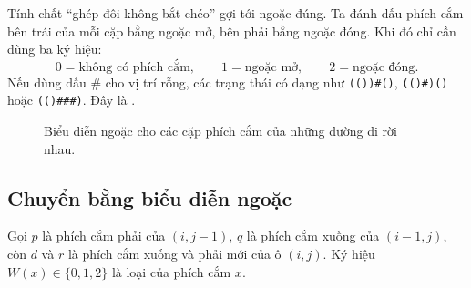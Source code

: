 \documentclass[11pt]{article}
\begin{document}
Tính chất ``ghép đôi không bắt chéo'' gợi tới ngoặc đúng. Ta đánh dấu phích
cắm bên trái của mỗi cặp bằng ngoặc mở, bên phải bằng ngoặc đóng. Khi đó chỉ
cần dùng ba ký hiệu:
\[
  0=\text{không có phích cắm},\qquad
  1=\text{ngoặc mở},\qquad
  2=\text{ngoặc đóng}.
\]
Nếu dùng dấu \(\#\) cho vị trí rỗng, các trạng thái có dạng như
\texttt{(())\#()}, \texttt{(()\#)()} hoặc \texttt{(()\#\#\#)}. Đây là
.

\begin{figure}[ht]
\centering
{}
\caption{Biểu diễn ngoặc cho các cặp phích cắm của những đường đi rời nhau.}
\end{figure}

\subsection{Chuyển bằng biểu diễn ngoặc}

Gọi \(p\) là phích cắm phải của \((i,j-1)\), \(q\) là phích cắm xuống của
\((i-1,j)\), còn \(d\) và \(r\) là phích cắm xuống và phải mới của ô
\((i,j)\). Ký hiệu \(W(x)\in\{0,1,2\}\) là loại của phích cắm \(x\).
\end{document}
